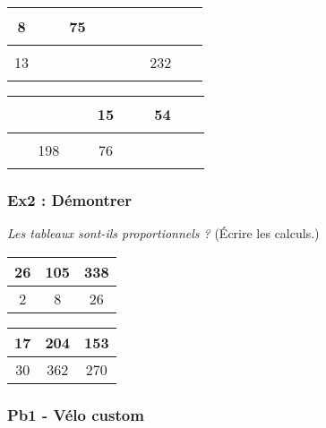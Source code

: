\begin{multicols}{2}\noindent
  \begin{center} \begin{tabular}{|c|c|c|}  \hline
    8  &                                75 & $\phantom{\dfrac{azertyuiop}{O}}$ \\  \hline
    13 & $\phantom{\dfrac{azertyuiop}{O}}$ & 232\\  \hline
    \end{tabular} \end{center}

  \begin{center} \begin{tabular}{|c|c|c|}  \hline
    $\phantom{\dfrac{azertyuiop}{O}}$ & 15 & 54 \\  \hline
                                  198 & 76 & $\phantom{\dfrac{azertyuiop}{O}}$\\  \hline
  \end{tabular} \end{center}

\end{multicols}

\subsubsection*{Ex2 : Démontrer} 

\textit{Les tableaux sont-ils proportionnels ?} (Écrire les calculs.) 

\begin{multicols}{2}\noindent
  \begin{center}\begin{tabular}{|c|c|c|} \hline
    26 & 105 & 338 \\  \hline
    2 & 8 & 26\\  \hline
  \end{tabular}\end{center}
\columnbreak 
  \begin{center}\begin{tabular}{|c|c|c|} \hline
    17 & 204 & 153 \\  \hline
    30 & 362 & 270\\  \hline
  \end{tabular}\end{center}

\end{multicols}

\subsubsection*{Pb1 - Vélo custom}

